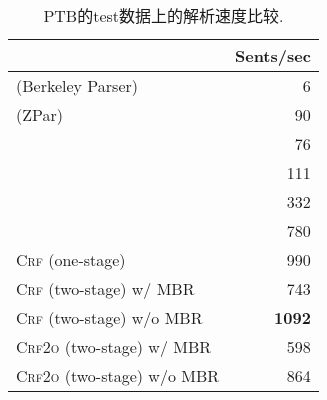 \begin{table}[tb]
    \setlength{\tabcolsep}{15pt}
    \centering
    \begin{tabular}{lr}
        \toprule
                                                             & Sents/sec     \\
        \midrule
        \cite{petrov-klein-2007-improved}  (Berkeley Parser) & 6             \\
        \cite{zhu-etal-2013-fast} (ZPar)                     & 90            \\
        \cite{stern-etal-2017-minimal}                       & 76            \\
        \cite{shen-etal-2018-straight}                       & 111           \\
        \cite{kitaev-klein-2018-constituency}                & 332           \\
        \cite{gomez-rodriguez-vilares-2018-constituent}      & 780           \\[3pt]
        \textsc{Crf} (one-stage)                             & 990           \\
        \textsc{Crf} (two-stage) w/ MBR                      & 743           \\
        \textsc{Crf} (two-stage) w/o MBR                     & \textbf{1092} \\
        \textsc{Crf2o} (two-stage) w/ MBR                    & 598           \\
        \textsc{Crf2o} (two-stage) w/o MBR                   & 864           \\

        \bottomrule
    \end{tabular}
    \caption{PTB的test数据上的解析速度比较.}
    \label{table:speed}
\end{table}